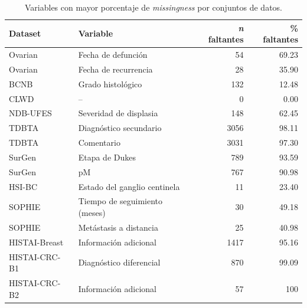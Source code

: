 \begin{table}[htbp]
\centering
\caption{Variables con mayor porcentaje de \textit{missingness} por conjuntos de datos.}
\label{tab:missingness_top_variables}
\small
\setlength{\tabcolsep}{5pt}
\begin{tabular}{llrr}
\toprule
Dataset & Variable & \textit{n} faltantes & \% faltantes \\
\midrule
Ovarian       & Fecha de defunción              & 54    & 69.23 \\
Ovarian       & Fecha de recurrencia            & 28    & 35.90 \\
BCNB          & Grado histológico               & 132   & 12.48 \\
CLWD          & --                              & 0     & 0.00 \\
NDB-UFES      & Severidad de displasia          & 148   & 62.45 \\
TDBTA         & Diagnóstico secundario          & 3056  & 98.11 \\
TDBTA         & Comentario                      & 3031  & 97.30 \\
SurGen        & Etapa de Dukes                & 789   & 93.59 \\
SurGen        & pM                            & 767   & 90.98 \\
HSI-BC        & Estado del ganglio centinela    & 11    & 23.40 \\
SOPHIE        & Tiempo de seguimiento (meses)   & 30    & 49.18 \\
SOPHIE        & Metástasis a distancia          & 25    & 40.98 \\
HISTAI-Breast & Información adicional           & 1417  & 95.16 \\
HISTAI-CRC-B1 & Diagnóstico diferencial  & 870   & 99.09 \\
HISTAI-CRC-B2 & Información adicional    & 57    & 100 \\
\bottomrule
\end{tabular}
\end{table}

\clearpage

